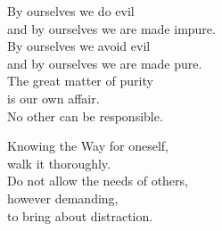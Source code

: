 By ourselves we do evil\\
and by ourselves we are made impure.\\
By ourselves we avoid evil\\
and by ourselves we are made pure.\\
The great matter of purity\\
is our own affair.\\
No other can be responsible.


Knowing the Way for oneself,\\
walk it thoroughly.\\
Do not allow the needs of others,\\
however demanding,\\
to bring about distraction.

